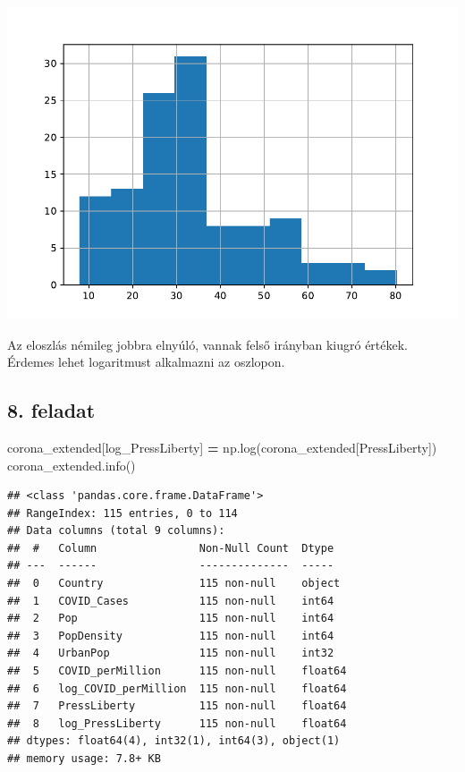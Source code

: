 \documentclass[
]{book}
\newenvironment{Shaded}{\begin{snugshade}}{\end{snugshade}}
\newcommand{\NormalTok}[1]{#1}
\newcommand{\OperatorTok}[1]{\textcolor[rgb]{0.81,0.36,0.00}{\textbf{#1}}}
\newcommand{\StringTok}[1]{\textcolor[rgb]{0.31,0.60,0.02}{#1}}
\begin{document}
\includegraphics{_main_files/figure-latex/unnamed-chunk-140-29.pdf}

Az eloszlás némileg jobbra elnyúló, vannak felső irányban kiugró értékek. Érdemes lehet logaritmust alkalmazni az oszlopon.

\subsection*{8. feladat}\label{feladat-7}

\begin{Shaded}
\begin{Highlighting}[]
\NormalTok{corona\_extended[}\StringTok{\textquotesingle{}log\_PressLiberty\textquotesingle{}}\NormalTok{] }\OperatorTok{=}\NormalTok{ np.log(corona\_extended[}\StringTok{\textquotesingle{}PressLiberty\textquotesingle{}}\NormalTok{])}
\NormalTok{corona\_extended.info()}
\end{Highlighting}
\end{Shaded}

\begin{verbatim}
## <class 'pandas.core.frame.DataFrame'>
## RangeIndex: 115 entries, 0 to 114
## Data columns (total 9 columns):
##  #   Column                Non-Null Count  Dtype  
## ---  ------                --------------  -----  
##  0   Country               115 non-null    object 
##  1   COVID_Cases           115 non-null    int64  
##  2   Pop                   115 non-null    int64  
##  3   PopDensity            115 non-null    int64  
##  4   UrbanPop              115 non-null    int32  
##  5   COVID_perMillion      115 non-null    float64
##  6   log_COVID_perMillion  115 non-null    float64
##  7   PressLiberty          115 non-null    float64
##  8   log_PressLiberty      115 non-null    float64
## dtypes: float64(4), int32(1), int64(3), object(1)
## memory usage: 7.8+ KB
\end{verbatim}
\end{document}

